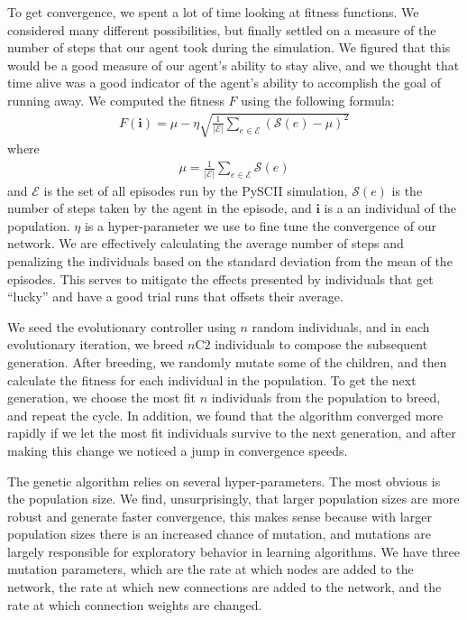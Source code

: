 \documentclass{article}
\begin{document}
\begin{multicols}{2}
To get convergence, we spent a lot of time looking at fitness functions. We
considered many different
possibilities, but finally settled on a measure of the number of steps that our
agent took during the simulation. We figured that this would be a good measure
of our agent's ability to stay alive, and we thought that time alive was a good
indicator of the agent's ability to accomplish the goal of running away. We
computed the fitness $F$ using the following formula:
\begin{align}
  F(\bm{i}) = \mu - \eta\sqrt{\frac{1}{|\bm{\mathcal{E}}|}
  \sum_{e \in \bm{\mathcal{E}}}\left(\mathcal{S}(e) - \mu\right)^2} 
\end{align}
where
\begin{align}
  \mu = \frac{1}{|\bm{\mathcal{E}}|} \sum_{e \in \bm{\mathcal{E}}} \mathcal{S}(e)
\end{align}
and $\bm{\mathcal{E}}$ is the set of all episodes run by the PySCII simulation,
$\mathcal{S}(e)$ is the number of steps taken by the agent in the episode, and
$\bm{i}$ is a an individual of the population. $\eta$ is a hyper-parameter we
use
to fine tune the convergence of our network. We are effectively calculating the
average number of steps and penalizing the individuals based on the standard
deviation from the mean of the episodes. This serves to mitigate the effects
presented by individuals that get ``lucky'' and have a good trial runs that
offsets their average.

We seed the evolutionary controller using $n$ random individuals, and in each
evolutionary iteration, we breed $n\text{C}2$ individuals to compose the
subsequent generation. After breeding, we randomly mutate some of the children,
and then calculate the fitness for each individual in the population. To get
the next generation, we choose the most fit $n$ individuals from the population
to breed, and repeat the cycle. In addition, we found that the algorithm
converged more rapidly if we let the most fit individuals survive to the next
generation, and after making this change we noticed a jump in convergence
speeds.

The genetic algorithm relies on several hyper-parameters. The most obvious is
the
population size. We find, unsurprisingly, that larger population sizes are more
robust and generate faster convergence, this makes sense because with larger
population sizes there is an increased chance of mutation, and mutations are
largely responsible for exploratory behavior in learning algorithms. We have
three mutation parameters, which are the rate at which nodes are added to the
network, the rate at which new connections are added to the network, and the
rate at which connection weights are changed.


\end{multicols}
\end{document}
